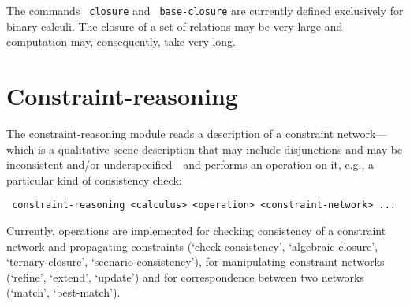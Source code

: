 \documentclass[headsepline]{scrreprt}
\theoremstyle{definition}
\newlength{\platz}
\newlength{\platznote}
\newcommand{\note}[1]{\noindent\usebox{\notetext}\parbox[t]{\platznote}{#1}}
\newcommand{\engine}{SparQ}
\begin{document}
\note{The commands \texttt{ closure} and \texttt{ base-closure} are currently defined exclusively for binary calculi. The closure of a set of relations may be very large and computation may, consequently, take very long.}



\section{Constraint-reasoning}\label{sec:constraint-reasoning}


The constraint-reasoning module reads a description of a constraint
network---which is a
qualitative scene description that may include disjunctions and may be
inconsistent and/or underspecified---and performs an operation on it,
e.g., a particular kind of consistency check:
\begin{center}
{\verb= constraint-reasoning <calculus> <operation> <constraint-network> ... = }
\end{center}

Currently, operations are implemented for
checking consistency of a constraint network and propagating constraints
(`check-consistency', `algebraic-closure', `ternary-closure', `scenario-consistency'),
for manipulating constraint networks (`refine', `extend', `update') and
for correspondence between two networks (`match', `best-match').

\end{document}
